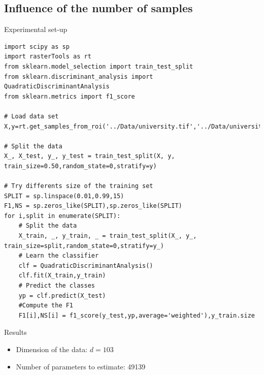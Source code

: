 \documentclass[10pt,aspectratio=1610,,color={dvipsnames,usenames,table},table]{beamer}
\begin{document}
\subsection{Influence of the number of samples}
\label{sec:org06a8958}
\begin{frame}[fragile,label={sec:org12f1820}]{Experimental set-up}
 \begin{verbatim}
import scipy as sp
import rasterTools as rt
from sklearn.model_selection import train_test_split
from sklearn.discriminant_analysis import QuadraticDiscriminantAnalysis
from sklearn.metrics import f1_score

# Load data set
X,y=rt.get_samples_from_roi('../Data/university.tif','../Data/university_gt.tif')

# Split the data
X_, X_test, y_, y_test = train_test_split(X, y, train_size=0.50,random_state=0,stratify=y)

# Try differents size of the training set
SPLIT = sp.linspace(0.01,0.99,15)
F1,NS = sp.zeros_like(SPLIT),sp.zeros_like(SPLIT)
for i,split in enumerate(SPLIT):
    # Split the data
    X_train, _, y_train, _ = train_test_split(X_, y_, train_size=split,random_state=0,stratify=y_)
    # Learn the classifier
    clf = QuadraticDiscriminantAnalysis()
    clf.fit(X_train,y_train)
    # Predict the classes
    yp = clf.predict(X_test)
    #Compute the F1
    F1[i],NS[i] = f1_score(y_test,yp,average='weighted'),y_train.size
\end{verbatim}
\end{frame}

\begin{frame}[label={sec:orgf3791db}]{Results}
\begin{center}
\end{center}

\begin{itemize}
\item Dimension of the data: \(d=103\)
\item Number of parameters to estimate: 49139
\end{itemize}
\end{frame}
\end{document}
